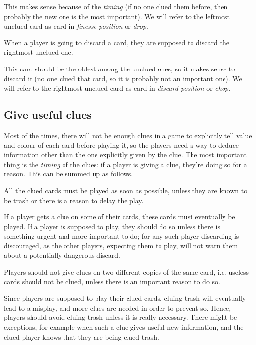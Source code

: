 This makes sense because of the \emph{timing} (if no one clued them before, then probably the new one is the most important). We will refer to the leftmost unclued card as card in \emph{finesse position} or \emph{drop}.

\begin{convention}
	\label{discard-right}
	When a player is going to discard a card, they are supposed to discard the rightmost unclued one.
\end{convention}

This card should be the oldest among the unclued ones, so it makes sense to discard it (no one clued that card, so it is probably not an important one). We will refer to the rightmost unclued card as card in \emph{discard position} or \emph{chop}.

\subsection{Give useful clues}

Most of the times, there will not be enough clues in a game to explicitly tell value and colour of each card before playing it, so the players need a way to deduce information other than the one explicitly given by the clue. The most important thing is the \emph{timing} of the clues: if a player is giving a clue, they're doing so for a reason. This can be summed up as follows.

\begin{convention}
	\label{clue-playable-cards}
	All the clued cards must be played as soon as possible, unless they are known to be trash or there is a reason to delay the play.
\end{convention}

If a player gets a clue on some of their cards, these cards must eventually be played. If a player is supposed to play, they should do so unless there is something urgent and more important to do; for any such player discarding is discouraged, as the other players, expecting them to play, will not warn them about a potentially dangerous discard.

\begin{convention}
	\label{disjoint-clues}
	Players should not give clues on two different copies of the same card, i.e. useless cards should not be clued, unless there is an important reason to do so.
\end{convention}

Since players are supposed to play their clued cards, cluing trash will eventually lead to a misplay, and more clues are needed in order to prevent so. Hence, players should avoid cluing trash unless it is really necessary. There might be exceptions, for example when such a clue gives useful new information, and the clued player knows that they are being clued trash.


